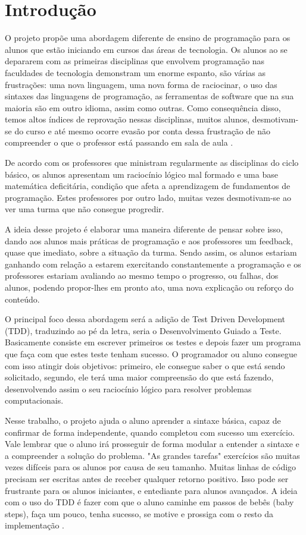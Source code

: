 \documentclass[pnumabnt,normaltoc,espacoumemeio,capchap]{abnt}
\begin{document}
\chapter{Introdução}
\par O projeto propõe uma abordagem diferente de ensino de programação para os alunos que estão iniciando em cursos das áreas de tecnologia. Os alunos ao se depararem com as primeiras disciplinas que envolvem programação nas faculdades de tecnologia demonstram um enorme espanto, são várias as frustrações: uma nova linguagem, uma nova forma de raciocinar, o uso das sintaxes das linguagens de programação, as ferramentas de software que na sua maioria são em outro idioma, assim como outras. Como consequência disso, temos altos índices de reprovação nessas disciplinas, muitos alunos, desmotivam-se do curso e até mesmo ocorre evasão por conta dessa frustração de não compreender o que o professor está passando em sala de aula \cite{SI11}.
\par De acordo com os professores que ministram regularmente as disciplinas do ciclo básico, os alunos apresentam um raciocínio lógico mal formado e uma base matemática deficitária, condição que afeta a aprendizagem de fundamentos de programação. Estes professores por outro lado, muitas vezes desmotivam-se ao ver uma turma que não consegue progredir.  
\par A ideia desse projeto é elaborar uma maneira diferente de pensar sobre isso, dando aos alunos mais práticas de programação e aos professores um feedback, quase que imediato, sobre a situação da turma. Sendo assim, os alunos estariam ganhando com relação a estarem exercitando constantemente a programação e os professores estariam avaliando ao mesmo tempo o progresso, ou falhas, dos alunos, podendo propor-lhes em pronto ato, uma nova explicação ou reforço do conteúdo.
\par O principal foco dessa abordagem será a adição de Test Driven Development (TDD), traduzindo ao pé da letra, seria o Desenvolvimento Guiado a Teste. Basicamente consiste em escrever primeiros os testes e depois fazer um programa que faça com que estes teste tenham sucesso. O programador ou aluno consegue com isso atingir dois objetivos: primeiro, ele consegue saber o que está sendo solicitado, segundo, ele terá uma maior compreensão do que está fazendo, desenvolvendo assim o seu raciocínio lógico para resolver problemas computacionais.
\par Nesse trabalho, o projeto ajuda o aluno aprender a sintaxe básica, capaz de confirmar de forma independente, quando completou com sucesso um exercício. Vale lembrar que o aluno irá prosseguir de forma modular a entender a sintaxe e a compreender a solução do problema. "As grandes tarefas" exercícios são muitas vezes difíceis para os alunos por causa de seu tamanho. Muitas linhas de código precisam ser escritas antes de receber qualquer retorno positivo. Isso pode ser frustrante para os alunos iniciantes, e entediante para alunos avançados. A ideia com o uso do TDD é fazer com que o aluno caminhe em passos de bebês (baby steps), faça um pouco, tenha sucesso, se motive e prossiga com o resto da implementação \cite{TF12}.
\end{document}
